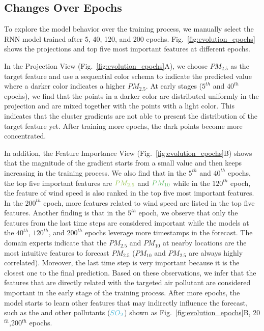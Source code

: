 \subsection{Changes Over Epochs}
To explore the model behavior over the training process, we manually select the RNN model trained after 5, 40, 120, and 200 epochs. Fig.~\ref{fig:evolution_epochs} shows the projections and top five most important features at different epochs.

In the Projection View (Fig.~\ref{fig:evolution_epochs}A), we choose $PM_{2.5}$ as the target feature and use a sequential color schema to indicate the predicted value where a darker color indicates a higher $PM_{2.5}$. 
At early stages ($5^{th}$ and $40^{th}$ epochs), we find that the points in a darker color are distributed uniformly in the projection and are mixed together with the points with a light color. 
This indicates that the cluster gradients are not able to present the distribution of the target feature yet.
After training more epochs, the dark points become more concentrated. 

In addition, the Feature Importance View (Fig.~\ref{fig:evolution_epochs}B) shows that the magnitude of the gradient starts from a small value and then keeps increasing in the training process. 
We also find that in the $5^{th}$ and $40^{th}$ epochs, the top five important features are $\color{PM25Color}{PM_{2.5}}$ and $\color{PM10Color}{PM_{10}}$ while in the $120^{th}$ epoch, the feature of wind speed is also ranked in the top five most important features. 
In the $200^{th}$ epoch, more features related to wind speed are listed in the top five features.
Another finding is that in the $5^{th}$ epoch, we observe that only the features from the last time steps are considered important while the models at the $40^{th}$, $120^{th}$, and $200^{th}$ epochs leverage more timestamps in the forecast.  
The domain experts indicate that the $PM_{2.5}$ and $PM_{10}$ at nearby locations are the most intuitive features to forecast $PM_{2.5}$ ($PM_{10}$ and $PM_{2.5}$ are always highly correlated).
Moreover, the last time step is very important because it is the closest one to the final prediction. 
Based on these observations, we infer that the features that are directly related with the targeted air pollutant are considered important in the early stage of the training process.
After more epochs, the model starts to learn other features that may indirectly influence the forecast, such as the \textit{\color{WINDColor}{Wind Speed}} and other pollutants ($\color{SO2Color}{SO_2}$) shown as Fig.~\ref{fig:evolution_epochs}B, 20$^{th}$,200$^{th}$ epochs. 

